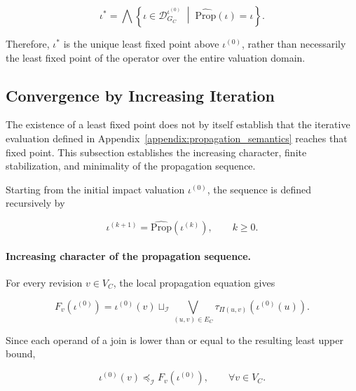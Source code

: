 \documentclass[10pt]{article}
\begin{document}
\begin{equation}
	\iota^{*}
	=
	\bigwedge
	\left\{
	\iota
	\in
	\mathcal D_{G_C}^{\iota^{(0)}}
	\;\middle|\;
	\widehat{\mathrm{Prop}}(\iota)
	=
	\iota
	\right\}.
	\label{eq:least_fixed_point_characterization}
\end{equation}

Therefore, $\iota^{*}$ is the unique least fixed point above $\iota^{(0)}$, rather than necessarily the least fixed point of the operator over the entire valuation domain.

\subsection{Convergence by Increasing Iteration}

The existence of a least fixed point does not by itself establish that the iterative evaluation defined in Appendix~\ref{appendix:propagation_semantics}
reaches that fixed point. This subsection establishes the increasing character, finite stabilization, and minimality of the propagation sequence.

Starting from the initial impact valuation $\iota^{(0)}$, the sequence is defined recursively by

\begin{equation}
	\iota^{(k+1)}
	=
	\widehat{\mathrm{Prop}}
	\!\left(
	\iota^{(k)}
	\right),
	\qquad
	k\geq 0.
	\label{eq:kleene_iteration}
\end{equation}

\paragraph{Increasing character of the propagation sequence.}

For every revision $v\in V_C$, the local propagation equation gives

\begin{equation}
	F_v\!\left(\iota^{(0)}\right)
	=
	\iota^{(0)}(v)
	\sqcup_{\mathcal I}
	\bigvee_{(u,v)\in E_C}
	\tau_{\Pi(u,v)}
	\!\left(
	\iota^{(0)}(u)
	\right).
	\label{eq:initial_local_expansion}
\end{equation}

Since each operand of a join is lower than or equal to the resulting least upper bound,

\begin{equation}
	\iota^{(0)}(v)
	\preceq_{\mathcal I}
	F_v\!\left(\iota^{(0)}\right),
	\qquad
	\forall v\in V_C.
	\label{eq:initial_component_growth}
\end{equation}
\end{document}
